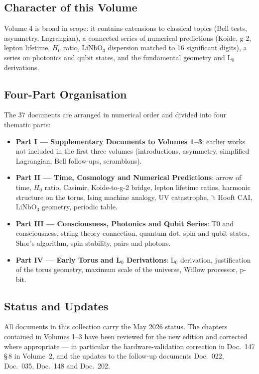 \subsection*{Character of this Volume}

Volume 4 is broad in scope: it contains extensions to classical topics (Bell
tests, asymmetry, Lagrangian), a connected series of numerical predictions
(Koide, g-2, lepton lifetime, $H_0$ ratio, $\mathrm{LiNbO}_3$ dispersion
matched to 16 significant digits), a series on photonics and qubit states,
and the fundamental geometry and L$_0$ derivations.

\subsection*{Four-Part Organisation}

The 37 documents are arranged in numerical order and divided into four
thematic parts:

\begin{itemize}
\item \textbf{Part I --- Supplementary Documents to Volumes 1--3}:
      earlier works not included in the first three volumes (introductions,
      asymmetry, simplified Lagrangian, Bell follow-ups, scramblons).
\item \textbf{Part II --- Time, Cosmology and Numerical Predictions}:
      arrow of time, $H_0$ ratio, Casimir, Koide-to-g-2 bridge, lepton
      lifetime ratios, harmonic structure on the torus, Ising machine
      analogy, UV catastrophe, 't Hooft CAI, $\mathrm{LiNbO}_3$ geometry,
      periodic table.
\item \textbf{Part III --- Consciousness, Photonics and Qubit Series}:
      T0 and consciousness, string-theory connection, quantum dot, spin
      and qubit states, Shor's algorithm, spin stability, pairs and photons.
\item \textbf{Part IV --- Early Torus and L$_0$ Derivations}: L$_0$
      derivation, justification of the torus geometry, maximum scale of
      the universe, Willow processor, p-bit.
\end{itemize}

\subsection*{Status and Updates}

All documents in this collection carry the May 2026 status. The chapters
contained in Volumes 1--3 have been reviewed for the new edition and
corrected where appropriate --- in particular the hardware-validation
correction in Doc.~147 §\,8 in Volume~2, and the updates to the follow-up
documents Doc.~022, Doc.~035, Doc.~148 and Doc.~202.
